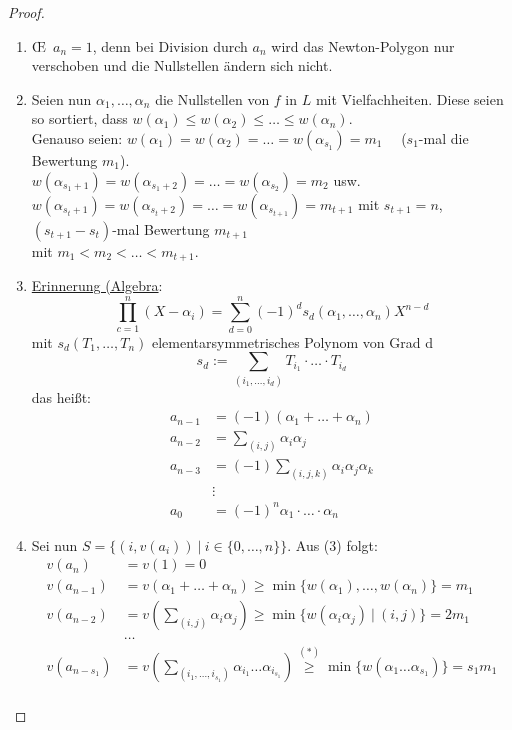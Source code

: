 
\begin{proof}
\begin{enumerate}[(1)]
\item \OE \ $a_n=1$, denn bei Division durch $a_n$ wird das Newton-Polygon nur verschoben und die Nullstellen ändern sich nicht.
\item Seien nun $\alpha_1, \dots, \alpha_n$ die Nullstellen von $f$ in $L$ mit Vielfachheiten. Diese seien so sortiert, dass $w(\alpha_1) \leq w(\alpha_2) \leq \ldots \leq w(\alpha_n)$.\\
Genauso seien: $w(\alpha_1) = w(\alpha_2)=\ldots = w(\alpha_{s_1})=m_1 \quad$ ($s_1$-mal die Bewertung $m_1$).\\
$w(\alpha_{s_1+1}) = w(\alpha_{s_1+2})=\ldots = w(\alpha_{s_2})=m_2 $ usw.\\
$w(\alpha_{s_t+1}) = w(\alpha_{s_t+2})=\ldots = w(\alpha_{s_{t+1}})=m_{t+1} $ mit $s_{t+1}=n$, $(s_{t+1}-s_t)$-mal Bewertung $m_{t+1}$\\
mit $m_1 < m_2 < \dots < m_{t+1}$.
\item \underline{Erinnerung (Algebra}:
\[\prod_{c=1}^n (X-\alpha_i) = \sum_{d=0}^n (-1)^d s_d (\alpha_1, \dots, \alpha_n) X^{n-d}\]
mit $s_d(T_1, \dots, T_n)$ elementarsymmetrisches Polynom von Grad d
\[s_d:=\sum_{(i_1, \dots, i_d)} T_{i_1} \cdot \ldots \cdot T_{i_d}\]
das heißt:
\begin{align*}
a_{n-1}&=(-1)(\alpha_1+\dots+\alpha_n)\\
a_{n-2}&=\sum_{(i,j)} \alpha_i \alpha_j\\
a_{n-3}&=(-1)\sum_{(i,j,k)} \alpha_i \alpha_j\alpha_k\\
&\vdots\\
a_0&=(-1)^n \alpha_1 \cdot \ldots \cdot \alpha_n
\end{align*}
\item Sei nun $S=\{(i,v(a_i)) \ | \ i \in \{0, \dots, n\}\}$. Aus (3) folgt:
\begin{align*}
v(a_n)&=v(1)=0\\
v(a_{n-1})&=v(\alpha_1 +\dots + \alpha_n) \geq \min \{w(\alpha_1), \dots, w(\alpha_n)\}=m_1\\
v(a_{n-2})&=v(\sum_{(i,j)} \alpha_i \alpha_j) \geq \min \{w(\alpha_i \alpha_j) \ | \ (i,j) \}=2 m_1\\
&\dots\\
v(a_{n-s_1})&=v(\sum_{(i_1,\dots, i_{s_1})} \alpha_{i_1} \dots \alpha_{i_{s_1}}) \stackrel{(*)}{\geq}\min \{w(\alpha_1 \dots \alpha_{s_1})\}=s_1 m_1\\

\end{align*}
\end{enumerate}
\end{proof}
